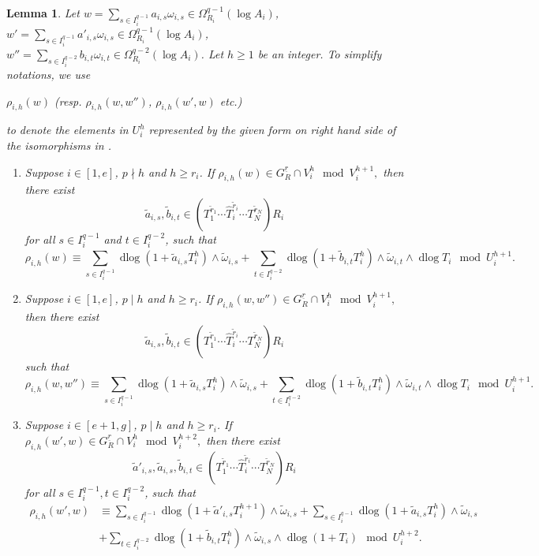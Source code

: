 \documentclass[11pt]{amsart}
\newcommand{\dlog}{\operatorname{dlog}}
\renewcommand{\hat}{\widehat}
\newcommand{\ul}{\underline}
\renewcommand{\tilde}{\widetilde}
\theoremstyle{plain}
\newtheorem{lem}[prop]{Lemma}
\theoremstyle{definition}
\numberwithin{equation}{prop}
\begin{document}
 
\begin{lem}\label{lem4}
Let $w=\sum_{s\in I_i^{q-1}}a_{i,s}\omega_{i,s}\in \Omega_{R_i}^{q-1}(\log A_i)$,
$w'=\sum_{s\in I_i^{q-1}}a'_{i,s}\omega_{i,s}\in \Omega_{R_i}^{q-1}(\log A_i)$,
$w''=\sum_{s\in I_i^{q-2}}b_{i,t}\omega_{i,t}\in \Omega_{R_i}^{q-2}(\log A_i)$.
Let $h\ge 1$ be an integer. 
To simplify notations, we use
\begin{center} 
$\rho_{i,h}(w)$ (resp. $\rho_{i,h}(w,w'')$, $\rho_{i,h}(w',w)$ etc.) 
\end{center} 
to denote the elements in $U_i^{h}$ represented by the given form on right hand side of the isomorphisms in .
\begin{enumerate}
\item 
\label{lem4(1)}
Suppose $i\in [1,e]$, $p\nmid h$ and $h\ge r_i$.    
If 
$\rho_{i,h}(w)\in G^{\ul r}_{R}\cap V_i^{h}\mod V_i^{h+1} ,$
then there exist
$$\tilde a_{i,s}, \tilde b_{i,t}\in (T_1^{\tilde r_1}\cdots \hat T_i^{\tilde r_i}\cdots T_N^{\tilde r_N})R_i$$
for all $s\in I_i^{q-1}$ and $t\in I_i^{q-2}$, such that
$$\rho_{i,h}(w)\equiv 
\sum_{s\in I_i^{q-1}} 
\dlog(1+\tilde a_{i,s}T_i^{h})\wedge \tilde \omega_{i,s}
+
\sum_{t\in I_i^{q-2}} \dlog(1+\tilde b_{i,t}T_i^{h})\wedge\tilde \omega_{i,t}\wedge \dlog T_i
\mod U_i^{h+1}.$$
\item \label{lem4(2)}
Suppose  $i\in [1,e]$, $p\mid h$ and $h\ge r_i$.    
If $\rho_{i,h}(w,w'')\in G^{\ul r}_{R}\cap V_i^{h}\mod V_i^{h+1},$
then there exist
$$\tilde a_{i,s}, \tilde b_{i,t}\in (T_1^{\tilde r_1}\cdots \hat T_i^{\tilde r_i}\cdots T_N^{\tilde r_N})R_i$$
such that 
$$\rho_{i,h}(w,w'')\equiv 
\sum_{s\in I_i^{q-1}} 
\dlog(1+\tilde a_{i,s}T_i^{h})\wedge \tilde \omega_{i,s}
+
\sum_{t\in I_i^{q-2}} 
\dlog(1+\tilde b_{i,t}T_i^{h})\wedge \tilde \omega_{i,t}\wedge\dlog T_i
\mod U_i^{h+1}.$$


\item \label{lem4(3)}
Suppose $i\in [e+1,g]$, $p\mid h$ and $h\ge r_i$.
If $\rho_{i,h}(w',w)\in G^{\ul r}_{R}\cap V_i^{h}\mod V_i^{h+2},$
then there exist
$$\tilde a'_{i,s}, \tilde a_{i,s}, \tilde b_{i,t}\in (T_1^{\tilde r_1}\cdots \hat T_i^{\tilde r_i}\cdots T_N^{\tilde r_N})R_i$$
for all $s\in I_i^{q-1}, t\in I_i^{q-2}$, such that
\begin{align*} 
\rho_{i,h}(w',w)
&\equiv 
\sum_{s\in I_i^{q-1}} \dlog(1+\tilde a'_{i,s}T_i^{h+1})\wedge\tilde\omega_{i,s}
+
\sum_{s\in I_i^{q-1}} \dlog(1+\tilde a_{i,s}T_i^{h})\wedge\tilde \omega_{i,s}
\\
&+ \sum_{t\in I_i^{q-2}} \dlog(1+\tilde b_{i,t}T_i^{h})\wedge\tilde \omega_{i,s}\wedge 
\dlog (1+T_i)
\mod U_i^{h+2}.
\end{align*} 



\end{enumerate}
\end{lem}
\end{document}
